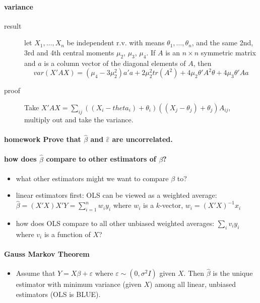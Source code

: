 \paragraph{variance \citep[also in][]{SeL_2003}}
\begin{description}
\item[result] let $X_1,\dots,X_n$ be independent r.v. with means
                  $\theta_1,\dots,\theta_n$, and the same 2nd, 3rd and
                  4th central moments $\mu_2$, $\mu_3$, $\mu_4$.  If $A$
                  is an $n\times n$ symmetric matrix and $a$ is a column
                  vector of the diagonal elements of $A$, then
                  \[ var(X'AX) = (\mu_4 - 3 \mu_2^2)a'a + 2 \mu_2^2
                  tr(A^2) + 4 \mu_2 \theta'A^2 \theta + 4 \mu_3 \theta' A
                  a \]
\item[proof] Take $X'A X = \sum_{ij} ((X_i - theta_i) + \theta_i) ((X_j - \theta_j) + \theta_j) A_{ij}$, multiply out and take the variance.
\end{description}

\paragraph{\textbf{homework} Prove that $\hat\beta$ and $\hat\varepsilon$ are uncorrelated.}

\paragraph{how does $\hat\beta$ compare to other estimators of $\beta$?}
\begin{itemize}
\item what other estimators might we want to compare $\beta$ to?
\item linear estimators first: OLS can be viewed as a weighted average:
        $\hat \beta = (X'X) X'Y = \sum_{i=1}^n w_i y_i$ where $w_i$ is a
        $k$-vector, $w_i = (X'X)^{-1} x_i$
\item how does OLS compare to all other unbiased weighted averages:
        $\sum_i v_i y_i$ where $v_i$ is a function of $X$?
\end{itemize}

\paragraph{Gauss Markov Theorem}
\begin{itemize}
\item Assume that $Y = X\beta + \varepsilon$ where $\varepsilon \sim
         (0, \sigma^2 I)$ given $X$.  Then $\hat\beta$ is the unique
         estimator with minimum variance (given $X$) among all linear,
         unbiased estimators (OLS is BLUE).
\end{itemize}

